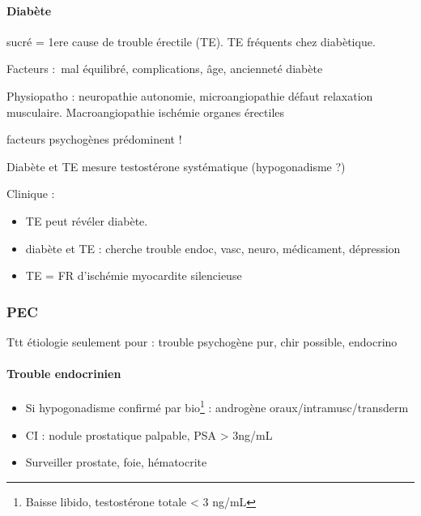 \documentclass[11pt]{article}
\begin{document}
\paragraph{Diabète}
\label{sec:orgcb26834}
sucré = 1ere cause de trouble érectile (TE). TE fréquents chez diabètique. 

Facteurs : mal équilibré, complications, âge, ancienneté diabète

Physiopatho : neuropathie autonomie, microangiopathie \thus défaut relaxation
musculaire. Macroangiopathie \thus ischémie organes érectiles

\danger facteurs psychogènes prédominent !

Diabète et TE \thus mesure testostérone systématique (hypogonadisme ?)

Clinique : 
\begin{itemize}
\item TE peut révéler diabète.
\item diabète et TE : cherche trouble endoc, vasc, neuro, médicament, dépression
\item TE = FR d'ischémie myocardite silencieuse \danger
\end{itemize}

\subsubsection{PEC}
\label{sec:org254c9fc}
Ttt étiologie seulement pour : trouble psychogène pur, chir possible, endocrino

\paragraph{Trouble endocrinien}
\label{sec:org0d15d84}
\begin{itemize}
\item Si hypogonadisme confirmé par bio\footnote{Baisse libido, testostérone totale < 3 ng/mL} : androgène oraux/intramusc/transderm
\item CI : nodule prostatique palpable, PSA > 3ng/mL
\item Surveiller prostate, foie, hématocrite
\end{itemize}
\end{document}
